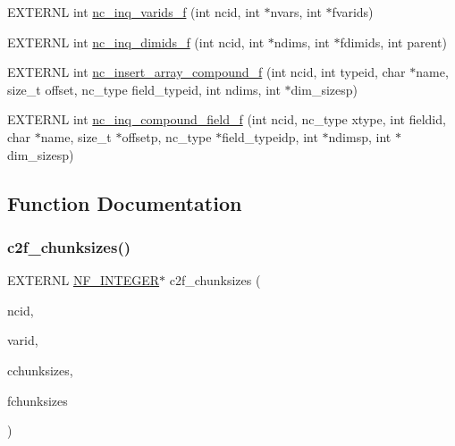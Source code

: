\begin{DoxyCompactItemize}
\item 
E\+X\+T\+E\+R\+NL int \hyperlink{fort-lib_8c_af5866b3dc8aa57cff7d29d7c879e9e4f}{nc\+\_\+inq\+\_\+varids\+\_\+f} (int ncid, int $\ast$nvars, int $\ast$fvarids)
\item 
E\+X\+T\+E\+R\+NL int \hyperlink{fort-lib_8c_a4290da001055c538b0753f021cfe3b53}{nc\+\_\+inq\+\_\+dimids\+\_\+f} (int ncid, int $\ast$ndims, int $\ast$fdimids, int parent)
\item 
E\+X\+T\+E\+R\+NL int \hyperlink{fort-lib_8c_aa1f760fcfe94404d16891cdfcc9463d8}{nc\+\_\+insert\+\_\+array\+\_\+compound\+\_\+f} (int ncid, int typeid, char $\ast$name, size\+\_\+t offset, nc\+\_\+type field\+\_\+typeid, int ndims, int $\ast$dim\+\_\+sizesp)
\item 
E\+X\+T\+E\+R\+NL int \hyperlink{fort-lib_8c_a42797cfb64cc969ae8c03b65207e7e85}{nc\+\_\+inq\+\_\+compound\+\_\+field\+\_\+f} (int ncid, nc\+\_\+type xtype, int fieldid, char $\ast$name, size\+\_\+t $\ast$offsetp, nc\+\_\+type $\ast$field\+\_\+typeidp, int $\ast$ndimsp, int $\ast$dim\+\_\+sizesp)
\end{DoxyCompactItemize}


\subsection{Function Documentation}
\mbox{\label{fort-lib_8c_a706533cd60fe8cc16c7268db18e64aa2}} 
\subsubsection{\texorpdfstring{c2f\+\_\+chunksizes()}{c2f\_chunksizes()}}
{\footnotesize\ttfamily E\+X\+T\+E\+R\+NL \hyperlink{ncfortran_8h_a0fd3f9e9fc30661142a1fb549af678e7}{N\+F\+\_\+\+I\+N\+T\+E\+G\+ER}$\ast$ c2f\+\_\+chunksizes (\begin{DoxyParamCaption}\item[{int}]{ncid,  }\item[{int}]{varid,  }\item[{const int $\ast$}]{cchunksizes,  }\item[{\hyperlink{ncfortran_8h_a0fd3f9e9fc30661142a1fb549af678e7}{N\+F\+\_\+\+I\+N\+T\+E\+G\+ER} $\ast$}]{fchunksizes }\end{DoxyParamCaption})}



